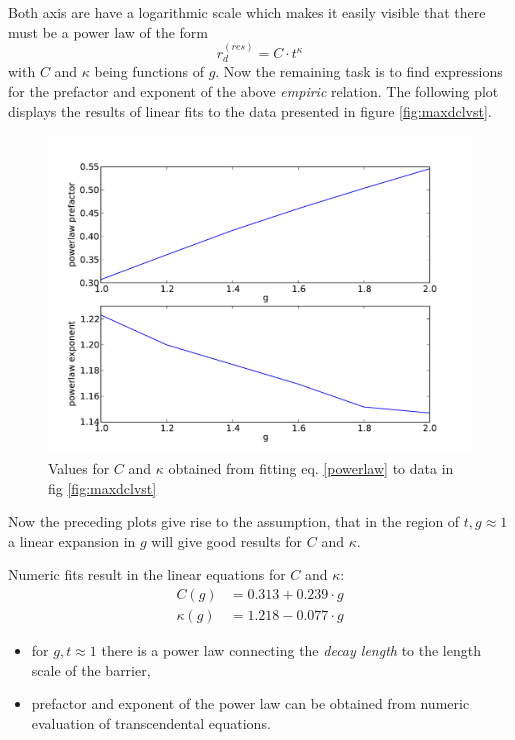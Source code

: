 Both axis are have a logarithmic scale which makes it easily visible that there must be a power law of the form
\begin{equation}
    r_d^{(res)} = C \cdot t^{\kappa}
    \label{powerlaw}
\end{equation}
with $C$ and $\kappa$ being functions of $g$. Now the remaining task is to find expressions for the prefactor and exponent of the above \textit{empiric} relation.
The following plot displays the results of linear fits to the data presented in figure \ref{fig:maxdclvst}.
\begin{figure}[H]
    \centering
    \includegraphics[width = 0.8 \textwidth]{plots/powerlawparameters.pdf}
    \caption{Values for $C$ and $\kappa$ obtained from fitting eq. \eqref{powerlaw} to data in fig \ref{fig:maxdclvst}}
    \label{fig:powerlawparameters}
\end{figure}
Now the preceding plots give rise to the assumption, that in the region of $t,g \approx 1$ a linear expansion in $g$ will give good results for $C$ and $\kappa$.\par
Numeric fits result in the linear equations for $C$ and $\kappa$:
\begin{align}
C(g) &= 0.313 + 0.239\cdot g \\
\kappa(g) &= 1.218 - 0.077 \cdot g
\end{align}
\begin{itemize}
    \item for $g,t \approx 1$ there is a power law connecting the \textit{decay length} to the length scale of the barrier,
    \item prefactor and exponent of the power law can be obtained from numeric evaluation of transcendental equations.
\end{itemize}

